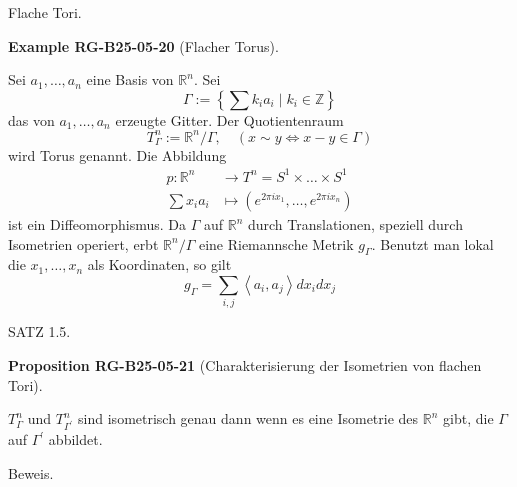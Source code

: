 \documentclass[10pt, letterpaper]{article}
\newcommand{\CustomHeading}[3]{%
  \par\medskip\noindent%
  \textbf{#1 #2} \textnormal{(#3)}.\enskip%
}
\newenvironment{PROP}[2]{\begin{unitbox}\CustomHeading{Proposition}{#1}{#2}}{\end{unitbox}}
\newenvironment{EXA}[2]{\begin{unitbox}\CustomHeading{Example}{#1}{#2}}{\end{unitbox}}
\begin{document}
Flache Tori. 


\begin{EXA}{RG-B25-05-20}{Flacher Torus}
Sei $a_{1}, \ldots, a_{n}$ eine Basis von $\mathbb{R}^{n}$. Sei
$$
\Gamma:=\left\{\sum k_{i} a_{i} \mid k_{i} \in \mathbb{Z}\right\}
$$
das von $a_{1}, \ldots, a_{n}$ erzeugte Gitter. Der Quotientenraum
$$
T_{\Gamma}^{n}:=\mathbb{R}^{n} / \Gamma, \quad(x \sim y \Longleftrightarrow x-y \in \Gamma)
$$
wird Torus genannt. Die Abbildung
$$
\begin{aligned}
p: \mathbb{R}^{n} & \rightarrow T^{n}=S^{1} \times \ldots \times S^{1} \\
\sum x_{i} a_{i} & \mapsto\left(e^{2 \pi i x_{1}}, \ldots, e^{2 \pi i x_{n}}\right)
\end{aligned}
$$
ist ein Diffeomorphismus. Da $\Gamma$ auf $\mathbb{R}^{n}$ durch Translationen, speziell durch Isometrien operiert, erbt $\mathbb{R}^{n} / \Gamma$ eine Riemannsche Metrik $g_{\Gamma}$. Benutzt man lokal die $x_{1}, \ldots, x_{n}$ als Koordinaten, so gilt
$$
g_{\Gamma}=\sum_{i, j}\left\langle a_{i}, a_{j}\right\rangle d x_{i} d x_{j}
$$
\end{EXA}



SATZ 1.5. 


\begin{PROP}{RG-B25-05-21}{Charakterisierung der Isometrien von flachen Tori}
$T_{\Gamma}^{n}$ und $T_{\Gamma^{\prime}}^{n}$ sind isometrisch genau dann wenn es eine Isometrie des $\mathbb{R}^{n}$ gibt, die $\Gamma$ auf $\Gamma^{\prime}$ abbildet.
\end{PROP}

Beweis. 
\end{document}
